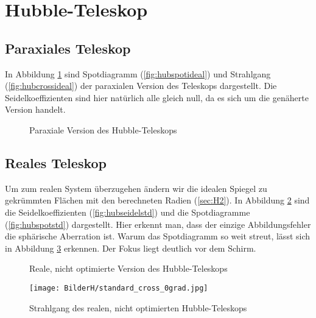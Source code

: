 \documentclass[twoside,colorback,accentcolor=tud4c,11pt]{tudreport}
\begin{document}
\section{Hubble-Teleskop}
\subsection{Paraxiales Teleskop}
In Abbildung \ref{fig:hubideal} sind Spotdiagramm (\ref{fig:hubspotideal}) und Strahlgang (\ref{fig:hubcrossideal}) der paraxialen Version des Teleskops dargestellt. Die Seidelkoeffizienten sind hier natürlich alle gleich null, da es sich um die genäherte Version handelt.
\begin{figure}[H]
\centering
  \quad
  \quad   
  \caption{Paraxiale Version des Hubble-Teleskops}
  \label{fig:hubideal}
\end{figure}
\subsection{Reales Teleskop}
Um zum realen System überzugehen ändern wir die idealen Spiegel zu gekrümmten Flächen mit den berechneten Radien (\ref{sec:H2}). In Abbildung \ref{fig:hubstd} sind die Seidelkoeffizienten (\ref{fig:hubseidelstd}) und die Spotdiagramme (\ref{fig:hubspotstd}) dargestellt. Hier erkennt man, dass der einzige Abbildungsfehler die sphärische Aberration ist. Warum das Spotdiagramm so weit streut, lässt sich in Abbildung \ref{fig:hubcrossstd} erkennen. Der Fokus liegt deutlich vor dem Schirm.
\begin{figure}[H]
\centering
  \quad
  \quad   
  \caption{Reale, nicht optimierte Version des Hubble-Teleskops}
  \label{fig:hubstd}
  
\end{figure}
\begin{figure}[H]
\centering
   	\begin{minipage}[b]{\textwidth}
   	\texttt{[image: BilderH/standard\_cross\_0grad.jpg]}
   	\caption{Strahlgang des realen, nicht optimierten Hubble-Teleskops}
  	\label{fig:hubcrossstd}
   	\end{minipage}
\end{figure}
\end{document}
